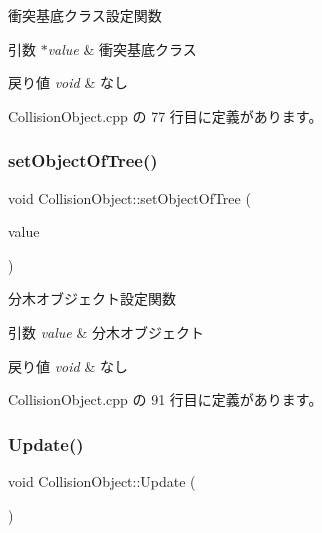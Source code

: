 衝突基底クラス設定関数 


\begin{DoxyParams}{引数}
{\em $\ast$value} & 衝突基底クラス \\
\hline
\end{DoxyParams}

\begin{DoxyRetVals}{戻り値}
{\em void} & なし \\
\hline
\end{DoxyRetVals}


 Collision\+Object.\+cpp の 77 行目に定義があります。

\mbox{\label{class_collision_object_ad95d376f91556186485040acfd15c578}} 
\subsubsection{\texorpdfstring{set\+Object\+Of\+Tree()}{setObjectOfTree()}}
{\footnotesize\ttfamily void Collision\+Object\+::set\+Object\+Of\+Tree (\begin{DoxyParamCaption}\item[{\mbox{\hyperlink{class_object_of_tree}{Object\+Of\+Tree}}$<$ \mbox{\hyperlink{class_collision_object}{Collision\+Object}} $\ast$$>$ $\ast$}]{value }\end{DoxyParamCaption})}



分木オブジェクト設定関数 


\begin{DoxyParams}{引数}
{\em value} & 分木オブジェクト \\
\hline
\end{DoxyParams}

\begin{DoxyRetVals}{戻り値}
{\em void} & なし \\
\hline
\end{DoxyRetVals}


 Collision\+Object.\+cpp の 91 行目に定義があります。

\mbox{\label{class_collision_object_a64d8242bb2f63730f94cece00fc5130e}} 
\subsubsection{\texorpdfstring{Update()}{Update()}}
{\footnotesize\ttfamily void Collision\+Object\+::\+Update (\begin{DoxyParamCaption}{ }\end{DoxyParamCaption})}



